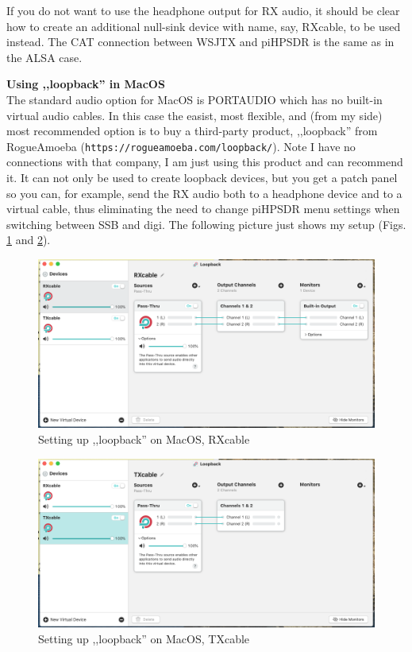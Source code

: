 \documentclass[12pt]{book}
\begin{document}
If you do not want to use the headphone output for RX audio, it should be clear how to
create an additional null-sink device with name, say, RXcable, to be used instead.
The CAT connection between WSJTX and piHPSDR is the same as in the ALSA case.

\textbf{\color{red}Using ,,loopback'' in MacOS}\\
The standard audio option for MacOS is PORTAUDIO which has no built-in virtual
audio cables. In this case
the easist, most flexible, and (from my side) most recommended option is
to buy a third-party product,  ,,loopback'' from RogueAmoeba
(\texttt{https://rogueamoeba.com/loopback/}).
Note I have no connections with that company, I am just using this product and
can recommend it. It can not only be used to create loopback devices, but you get
a patch panel so you can, for example, send the RX audio both to a headphone device
and to a virtual cable, thus eliminating the need to change piHPSDR menu settings
when switching between SSB and digi. The following picture just shows my setup
(Figs. \ref{fig:loopback_rx} and \ref{fig:loopback_tx}).

\begin{figure}[ht!]
\center
\includegraphics[width=12cm]{loopback_rx.png}
\caption{Setting up ,,loopback'' on MacOS, RXcable}
\label{fig:loopback_rx}
\end{figure}

\begin{figure}[ht!]
\center
\includegraphics[width=12cm]{loopback_tx.png}
\caption{Setting up ,,loopback'' on MacOS, TXcable}
\label{fig:loopback_tx}
\end{figure}
\end{document}
